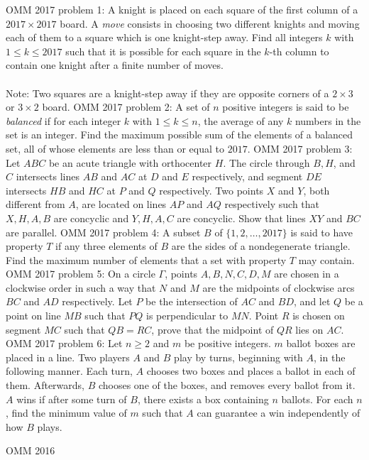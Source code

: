 OMM 2017 problem 1:  A knight is placed on each square of the first column of a $2017 \times 2017$ board. A \textit{move} consists in choosing two different knights and moving each of them to a square which is one knight-step away. Find all integers $k$ with $1 \leq k \leq 2017$ such that it is possible for each square in the $k$-th column to contain one knight after a finite number of moves. \\\\
Note: Two squares are a knight-step away if they are opposite corners of a $2 \times 3$ or $3 \times 2$ board. 
OMM 2017 problem 2:  A set of $n$ positive integers is said to be \textit{balanced} if for each integer $k$ with $1 \leq k \leq n$, the average of any $k$ numbers in the set is an integer. Find the maximum possible sum of the elements of a balanced set, all of whose elements are less than or equal to $2017$. 
OMM 2017 problem 3:  Let $ABC$ be an acute triangle with orthocenter $H$. The circle through $B, H$, and $C$ intersects lines $AB$ and $AC$ at $D$ and $E$ respectively, and segment $DE$ intersects $HB$ and $HC$ at $P$ and $Q$ respectively. Two points $X$ and $Y$, both different from $A$, are located on lines $AP$ and $AQ$ respectively such that $X, H, A, B$ are concyclic and $Y, H, A, C$ are concyclic. Show that lines $XY$ and $BC$ are parallel. 
OMM 2017 problem 4:  A subset $B$ of $\{1, 2, \dots, 2017\}$ is said to have property $T$ if any three elements of $B$ are the sides of a nondegenerate triangle. Find the maximum number of elements that a set with property $T$ may contain. 
OMM 2017 problem 5:  On a circle $\Gamma$, points $A, B, N, C, D, M$ are chosen in a clockwise order in such a way that $N$ and $M$ are the midpoints of clockwise arcs $BC$ and $AD$ respectively. Let $P$ be the intersection of $AC$ and $BD$, and let $Q$ be a point on line $MB$ such that $PQ$ is perpendicular to $MN$. Point $R$ is chosen on segment $MC$ such that $QB = RC$, prove that the midpoint of $QR$ lies on $AC$. 
OMM 2017 problem 6:  Let $n \geq 2$ and $m$ be positive integers. $m$ ballot boxes are placed in a line. Two players $A$ and $B$ play by turns, beginning with $A$, in the following manner. Each turn, $A$ chooses two boxes and places a ballot in each of them. Afterwards, $B$ chooses one of the boxes, and removes every ballot from it. $A$ wins if after some turn of $B$, there exists a box containing $n$ ballots. For each $n$, find the minimum value of $m$ such that $A$ can guarantee a win independently of how $B$ plays. 

OMM 2016 

